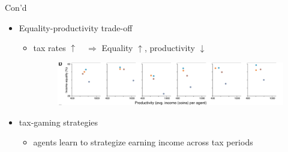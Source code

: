 \documentclass{beamer}
\begin{document}
    \begin{frame}{Con'd}
        \begin{itemize}
            \item Equality-productivity trade-off
                \begin{itemize}
                    \item tax rates $\uparrow \quad \Rightarrow$ Equality $\uparrow$, productivity $\downarrow$
                    \begin{flushleft}
                    \begin{figure}
                        \includegraphics[width=10cm]{./img/pic4.png}
                    \end{figure}
                    \end{flushleft}
                \end{itemize}
            \item tax-gaming strategies
                \begin{itemize}
                    \item agents learn to strategize earning income across tax periods 
                \end{itemize}
            \begin{figure}[htb]

\end{figure}
\end{itemize}
\end{frame}
\end{document}
